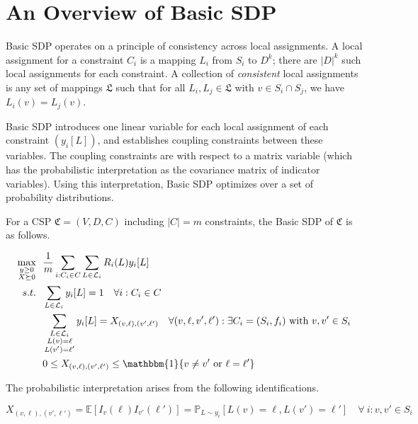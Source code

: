 \documentclass[12pt]{article} %
\begin{document}
\section{An Overview of Basic SDP}

Basic SDP operates on a principle of consistency across local assignments. A local assignment for a constraint $C_i$ is a mapping $L_i$ from $S_i$ to $D^{k}$; there are $|D|^k$ such local assignments for each constraint. A collection of \textit{consistent} local assignments is any set of mappings $\mathfrak{L}$ such that for all $L_i, L_j \in \mathfrak{L}$ with $v \in S_i \cap S_j$, we have $L_i(v) = L_j(v)$.

Basic SDP introduces one linear variable for each local assignment of each constraint $(y_i[L])$, and establishes coupling constraints between these variables. The coupling constraints are with respect to a matrix variable (which has the probabilistic interpretation as the covariance matrix of indicator variables). Using this interpretation, Basic SDP optimizes over a set of probability distributions.

For a CSP $\mathfrak{C} = (V,D,C)$ including $|C| = m$ constraints, the Basic SDP of $\mathfrak{C}$ is as follows.

\begin{align}
\operatorname*{max}_{\substack{y \geq 0 \\  X \succeq 0}} ~ & ~ \frac{1}{m}\sum\limits_{i:C_i\in C} \sum\limits_{L\in \mathcal{L}_i} R_i(L)y_i[L]  \nonumber  \\
s.t. ~ & ~ \sum\limits_{L \in \mathcal{L}_i} y_i[L] = 1  \quad \forall i : C_i \in C \\
& ~ \sum\limits_{\substack{L \in \mathcal{L}_i \\ L(v)=\ell \\ L(v')=\ell '}} y_i[L] = X_{(v,\ell),(v',\ell')}  \quad \forall (v,\ell,v',\ell') : \exists C_i = (S_i, f_i) \text{ with } v,v' \in S_i \\
& ~ 0 \leq  X_{(v,\ell),(v',\ell')}  \leq \mathbbm{1}\{ v \neq v' \text{ or } \ell = \ell' \}
\end{align}

The probabilistic interpretation arises from the following identifications.

\begin{equation}
X_{(v,\ell),(v',\ell')} = \mathbb{E}[I_v(\ell)I_{v'}(\ell')] = \mathbb{P}_{L\sim y_i}[L(v)=\ell, L(v')=\ell'] \quad \forall ~ i : v,v' \in S_i
\end{equation}
\end{document}
